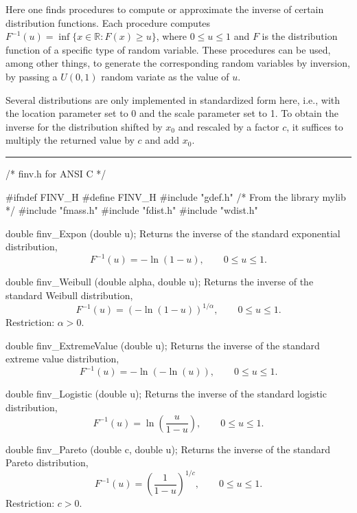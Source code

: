 
Here one finds procedures to compute or approximate the 
inverse of certain distribution functions.  
Each procedure computes $F^{-1}(u) = \inf\{x\in\mathbb{R} : F(x)\ge u\}$,
where $0\le u\le 1$ and $F$
is the distribution function of a specific type of random variable.
These procedures can be used, among other things, to generate
the corresponding random variables by inversion, by passing a
$U(0,1)$ random variate as the value of $u$.

Several distributions are only implemented in standardized form here,
i.e., with the location parameter set to 0 and the scale parameter
set to 1.  To obtain the inverse for the distribution shifted 
by $x_0$ and rescaled by a factor $c$, it suffices to multiply the
returned value by $c$ and add $x_0$.

\bigskip\hrule\medskip
\code\hide
/* finv.h for ANSI C */

#ifndef FINV_H
#define FINV_H
\endhide
#include "gdef.h"     /* From the library mylib */
#include "fmass.h"
#include "fdist.h"
#include "wdist.h"
\endcode


\code

double finv_Expon (double u);
\endcode
  \tab
  Returns the inverse of the standard exponential distribution,
$$
     F^{-1}(u) = -\ln (1-u), \qquad  0 \le u \le 1.
$$
 \endtab
\code

double finv_Weibull (double alpha, double u);
\endcode
  \tab
  Returns the inverse of the standard Weibull distribution,
$$
     F^{-1}(u) = \left(-\ln (1-u) \right)^{1/\alpha}, \qquad  0 \le u \le 1.
$$
  Restriction: $\alpha > 0$.
 \endtab
\code


double finv_ExtremeValue (double u);
\endcode
  \tab
  Returns the inverse of the standard extreme value distribution,
$$
     F^{-1}(u) = -\ln (-\ln (u)), \qquad  0 \le u \le 1.
$$
 \endtab
\code

double finv_Logistic (double u);
\endcode
  \tab
  Returns the inverse of the standard logistic distribution,
$$
     F^{-1}(u) = \ln  \left(\frac{u}{1-u}\right), \qquad  0 \le u \le 1.
$$
 \endtab
\code

double finv_Pareto (double c, double u);
\endcode
  \tab
  Returns the inverse of the standard Pareto distribution,
$$
     F^{-1}(u) = \left(\frac 1 {1 - u}\right)^{1/c}, 
          \qquad  0 \le u \le 1.
$$
  Restriction: $c > 0$.
 \endtab
\code


